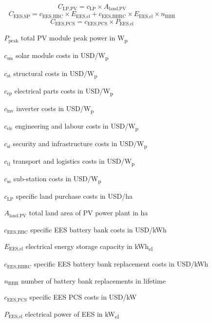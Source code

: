 \begin{equation}
C_{\text{LP,PV}} = c_{\text{LP}}\times A_{\text{land,PV}}
\end{equation} 
\begin{equation}
C_{\text{EES,SP}} = c_{\text{EES,BBC}} \times E_{\text{EES,el}} + c_{\text{EES,BBRC}} \times E_{\text{EES,el}}  \times n_{\text{BBR}}
\end{equation}
\begin{equation}
C_{\text{EES,PCS}} = c_{\text{EES,PCS}} \times P_{\text{EES,el}}
\end{equation}
\begin{itemize}
\item[ ] 
\begin{itemize}
\item[ ] 
\begin{itemize}
\item[$P_{\text{peak}}$]total PV module peak power in W\textsubscript{p}
\item[$c_{\text{sm}}$]solar module costs in USD/W\textsubscript{p}
\item[$c_{\text{st}}$]structural costs in USD/W\textsubscript{p}
\item[$c_{\text{ep}}$]electrical parts costs in USD/W\textsubscript{p}
\item[$c_{\text{inv}}$]inverter costs in USD/W\textsubscript{p}
\item[$c_{\text{elc}}$]engineering and labour costs in USD/W\textsubscript{p}
\item[$c_{\text{si}}$]security and infrastructure costs in USD/W\textsubscript{p}
\item[$c_{\text{tl}}$]transport and logistics costs in USD/W\textsubscript{p}
\item[$c_{\text{ss}}$]sub-station costs in USD/W\textsubscript{p}
\item[$c_{\text{LP}}$]specific land purchase costs in USD/ha
\item[$A_{\text{land,PV}}$]total land area of PV power plant in ha
\item[$c_{\text{EES,BBC}} $]specific EES battery bank costs in USD/kWh\item[$E_{\text{EES,el}}$]electrical energy storage capacity in kWh\textsubscript{el}
\item[$c_{\text{EES,BBRC}}$]specific EES battery bank replacement costs in USD/kWh
\item[$n_{\text{BBR}}$]number of battery bank replacements in lifetime
\item[$c_{\text{EES,PCS}} $]specific EES PCS costs in USD/kW
\item[$P_{\text{EES,el}} $]electrical power of EES in kW\textsubscript{el}
\end{itemize}
\end{itemize}
\end{itemize}
